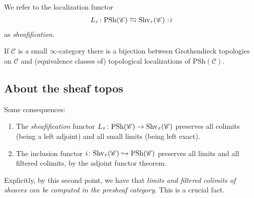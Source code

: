 \documentclass[11pt,openany]{book}
\renewcommand{\Pre}{\mathrm{PSh}}
\begin{document}
\begin{terminology} We refer to the localization functor
\begin{align*}
    L_\tau \colon \Pre(\mathscr{C}) \leftrightarrows \Shv_\tau (\mathscr{C}) \noloc i
\end{align*}
as \textit{sheafification}.
\end{terminology}

\begin{proposition} \cite[6.2.2.17]{HTT} If $\mathscr{C}$ is a small $\infty$-category there is a bijection between Grothendieck topologies on $\mathscr{C}$ and (equivalence classes of) topological localizations of $\Pre(\mathscr{C})$.
\end{proposition}

\subsection{About the sheaf topos}

\begin{corollary}\label{cor:properties-sheafification} 
Some consequences:
\begin{enumerate}
    \item The \textit{sheafification} functor $L_\tau \colon \Pre(\mathscr{C}) \to \Shv_\tau(\mathscr{C})$ preserves all colimits (being a left adjoint) and all small limits (being left exact).

    \item The inclusion functor $i \colon \Shv_\tau(\mathscr{C}) \hookto \Pre(\mathscr{C})$ preserves all limits and all filtered colimits, by the adjoint functor theorem.
\end{enumerate}
\end{corollary}

Explicitly, by this second point, we have that \textit{limits and filtered colimits of sheaves can be computed in the presheaf category}. This is a crucial fact.
\end{document}
